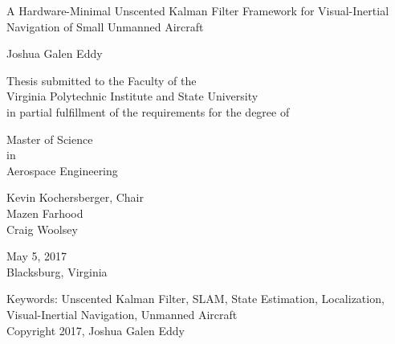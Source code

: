 \thispagestyle{empty}

\begin{center}
{\Large 
A Hardware-Minimal Unscented Kalman Filter Framework for Visual-Inertial Navigation of Small Unmanned Aircraft
}
\vfill

Joshua Galen Eddy

\vfill

Thesis submitted to the Faculty of the \\
Virginia Polytechnic Institute and State University \\
in partial fulfillment of the requirements for the degree of

\vfill

Master of Science \\
in \\
Aerospace Engineering

\vfill

Kevin Kochersberger, Chair \\
Mazen Farhood \\
Craig Woolsey

\vfill

May 5, 2017 \\
Blacksburg, Virginia

\vfill

Keywords: Unscented Kalman Filter, SLAM, State Estimation, Localization,\\
Visual-Inertial Navigation, Unmanned Aircraft
\\
Copyright 2017, Joshua Galen Eddy
\end{center}

\pagebreak